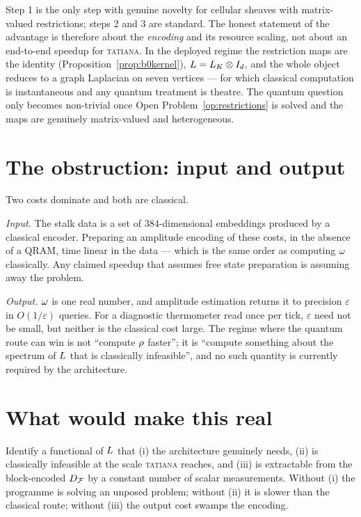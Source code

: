\begin{remark}
Step 1 is the only step with genuine novelty for cellular sheaves with
matrix-valued restrictions; steps 2 and 3 are standard. The honest
statement of the advantage is therefore about the \emph{encoding} and
its resource scaling, not about an end-to-end speedup for
\textsc{tatiana}. In the deployed regime the restriction maps are the
identity (Proposition~\ref{prop:b0kernel}), $L=L_K\otimes I_d$, and
the whole object reduces to a graph Laplacian on seven vertices --- for
which classical computation is instantaneous and any quantum treatment
is theatre. The quantum question only becomes non-trivial once
Open Problem~\ref{op:restrictions} is solved and the maps are genuinely
matrix-valued and heterogeneous.
\end{remark}

\section{The obstruction: input and output}

\begin{hon}\Hon
Two costs dominate and both are classical.

\emph{Input.} The stalk data is a set of $384$-dimensional embeddings
produced by a classical encoder. Preparing an amplitude encoding of
these costs, in the absence of a QRAM, time linear in the data --- which
is the same order as computing $\omega$ classically. Any claimed
speedup that assumes free state preparation is assuming away the
problem.

\emph{Output.} $\omega$ is one real number, and amplitude estimation
returns it to precision $\varepsilon$ in $O(1/\varepsilon)$ queries. For
a diagnostic thermometer read once per tick, $\varepsilon$ need not be
small, but neither is the classical cost large. The regime where the
quantum route can win is not ``compute $\rho$ faster''; it is
``compute something about the spectrum of $L$ that is classically
infeasible'', and no such quantity is currently required by the
architecture.
\end{hon}

\section{What would make this real}

\begin{openproblem}\label{op:quantumquantity}
Identify a functional of $L$ that (i) the architecture genuinely
needs, (ii) is classically infeasible at the scale \textsc{tatiana}
reaches, and (iii) is extractable from the block-encoded $D_{\mathcal{F}}$ by a
constant number of scalar measurements. Without (i) the programme is
solving an unposed problem; without (ii) it is slower than the classical
route; without (iii) the output cost swamps the encoding.
\end{openproblem}

